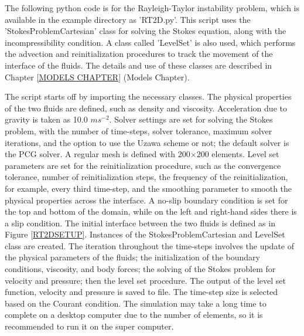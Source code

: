 %
%
The following python code is for the Rayleigh-Taylor instability problem, which is available in the example directory as 'RT2D.py'. This script uses the 'StokesProblemCartesian' class for solving the Stokes equation, along with the incompressibility condition. A class called 'LevelSet' is also used, which performs the advection and reinitialization procedures to track the movement of the interface of the fluids. The details and use of these classes are described in Chapter \ref{MODELS CHAPTER} (Models Chapter).

The script starts off by importing the necessary classes. The physical properties of the two fluids are defined, such as density and viscosity. Acceleration due to gravity is taken as 10.0 $ms^{-2}$. Solver settings are set for solving the Stokes problem, with the number of time-steps, solver tolerance, maximum solver iterations, and the option to use the Uzawa scheme or not; the default solver is the PCG solver. A regular mesh is defined with 200$\times$200 elements. Level set parameters are set for the reinitialization procedure, such as the convergence tolerance, number of reinitialization steps, the frequency of the reinitialization, for example, every third time-step, and the smoothing parameter to smooth the physical properties across the interface. A no-slip boundary condition is set for the top and bottom of the domain, while on the left and right-hand sides there is a slip condition. The initial interface between the two fluids is defined as in Figure \ref{RT2DSETUP}. Instances of the StokesProblemCartesian and LevelSet class are created. The iteration throughout the time-steps involves the update of the physical parameters of the fluids; the initialization of the boundary conditions, viscosity, and body forces; the solving of the Stokes problem for velocity and pressure; then the level set procedure. The output of the level set function, velocity and pressure is saved to file. The time-step size is selected based on the Courant condition. The simulation may take a long time to complete on a desktop computer due to the number of elements, so it is recommended to run it on the super computer.  
%
